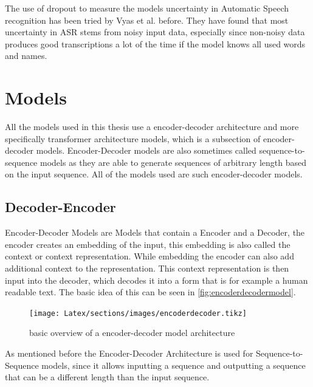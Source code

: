 The use of dropout to measure the models uncertainty in Automatic Speech recognition has been tried by Vyas et al. \cite{8683086} before.
They have found that most uncertainty in ASR stems from noisy input data, especially since non-noisy data produces good transcriptions a lot of the time if the model knows all used words and names. 

\section{Models}
\label{ch:models}
All the models used in this thesis use a encoder-decoder architecture and more specifically transformer architecture models, which is a subsection of encoder-decoder models. Encoder-Decoder models are also sometimes called sequence-to-sequence models as they are able to generate sequences of arbitrary length based on the input sequence.
All of the models used are such encoder-decoder models. 

\subsection{Decoder-Encoder}

Encoder-Decoder Models are Models that contain a Encoder and a Decoder, the encoder creates an embedding of the input, this embedding is also called the context or context representation. While embedding the encoder can also add additional context to the representation. 
This context representation is then input into the decoder, which decodes it into a form that is for example a human readable text. 
The basic idea of this can be seen in \autoref{fig:encoderdecodermodel}.
\begin{figure}[ht]
    \centering%
    \texttt{[image: Latex/sections/images/encoderdecoder.tikz]}
    \caption{basic overview of a encoder-decoder model architecture}
    \label{fig:encoderdecodermodel}
\end{figure}

As mentioned before the Encoder-Decoder Architecture is used for Sequence-to-Sequence models, since it allows inputting a sequence and outputting a sequence that can be a different length than the input sequence. \cite[chapter~8.7]{jm3}

